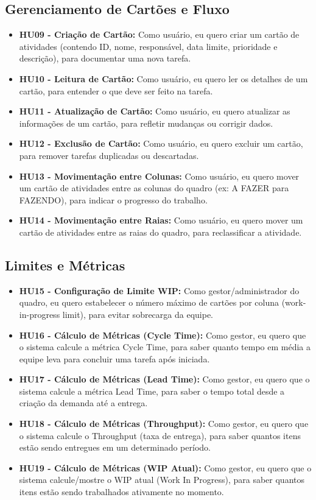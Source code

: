 \subsection{Gerenciamento de Cartões e Fluxo}
\begin{itemize}
    \item \textbf{HU09 - Criação de Cartão:} Como usuário, eu quero criar um cartão
    de atividades (contendo ID, nome, responsável, data limite, prioridade e 
    descrição), para documentar uma nova tarefa.
    \item \textbf{HU10 - Leitura de Cartão:} Como usuário, eu quero ler os detalhes
    de um cartão, para entender o que deve ser feito na tarefa.
    \item \textbf{HU11 - Atualização de Cartão:} Como usuário, eu quero atualizar
    as informações de um cartão, para refletir mudanças ou corrigir dados.
    \item \textbf{HU12 - Exclusão de Cartão:} Como usuário, eu quero excluir um 
    cartão, para remover tarefas duplicadas ou descartadas.
    \item \textbf{HU13 - Movimentação entre Colunas:} Como usuário, eu quero 
    mover um cartão de atividades entre as colunas do quadro (ex: A FAZER para 
    FAZENDO), para indicar o progresso do trabalho.
    \item \textbf{HU14 - Movimentação entre Raias:} Como usuário, eu quero mover um
    cartão de atividades entre as raias do quadro, para reclassificar a atividade.
\end{itemize}

\subsection{Limites e Métricas}
\begin{itemize}
    \item \textbf{HU15 - Configuração de Limite WIP:} Como gestor/administrador do 
    quadro, eu quero estabelecer o número máximo de cartões por coluna (work-in-progress 
    limit), para evitar sobrecarga da equipe.
    \item \textbf{HU16 - Cálculo de Métricas (Cycle Time):} Como gestor, eu quero que
    o sistema calcule a métrica Cycle Time, para saber quanto tempo em média a equipe 
    leva para concluir uma tarefa após iniciada.
    \item \textbf{HU17 - Cálculo de Métricas (Lead Time):} Como gestor, eu quero que
    o sistema calcule a métrica Lead Time, para saber o tempo total desde a criação da 
    demanda até a entrega.
    \item \textbf{HU18 - Cálculo de Métricas (Throughput):} Como gestor, eu quero 
    que o sistema calcule o Throughput (taxa de entrega), para saber quantos itens 
    estão sendo entregues em um determinado período.
    \item \textbf{HU19 - Cálculo de Métricas (WIP Atual):} Como gestor, eu quero que
    o sistema calcule/mostre o WIP atual (Work In Progress), para saber quantos itens 
    estão sendo trabalhados ativamente no momento.
\end{itemize}


